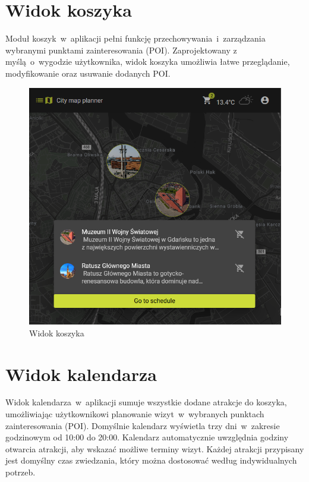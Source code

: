\section{Widok koszyka}
\label{sec:koszyk}

Moduł koszyk~w~aplikacji pełni funkcję przechowywania~i~zarządzania wybranymi punktami zainteresowania (POI). 
Zaprojektowany z myślą~o~wygodzie użytkownika, widok koszyka umożliwia łatwe przeglądanie, modyfikowanie oraz usuwanie dodanych POI.

    \begin{figure}[H]
        \centering
        \includegraphics[width=1\textwidth]{attachments/koszyk}
        \caption{Widok koszyka}
        \label{fig:koszyk}
\end{figure}

\section{Widok kalendarza}
\label{sec:kalendarz}
Widok kalendarza~w~aplikacji sumuje wszystkie dodane atrakcje do koszyka, umożliwiając użytkownikowi planowanie wizyt~w~wybranych punktach zainteresowania (POI). 
Domyślnie kalendarz wyświetla trzy dni~w~zakresie godzinowym od 10:00 do 20:00.
Kalendarz automatycznie uwzględnia godziny otwarcia atrakcji, aby wskazać możliwe terminy wizyt. 
Każdej atrakcji przypisany jest domyślny czas zwiedzania, który można dostosować według indywidualnych potrzeb.


